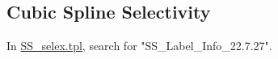 	 


\subsection{Cubic Spline Selectivity}
In \href{https://github.com/nmfs-stock-synthesis/stock-synthesis/blob/main/SS_selex.tpl}{SS\_selex.tpl}, search for "SS\_Label\_Info\_22.7.27".


